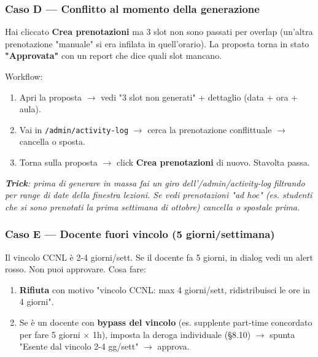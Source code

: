 \documentclass[11pt,a4paper]{article}
\renewenvironment{quote}
  {\begin{list}{}{%
      \setlength{\leftmargin}{8pt}%
      \setlength{\rightmargin}{8pt}%
      \setlength{\topsep}{6pt}%
      \setlength{\parsep}{0pt}}%
      \item\relax\color{black!75}\itshape}
  {\end{list}}
\begin{document}
\subsubsection{Caso D --- Conflitto al momento della generazione}


Hai cliccato \textbf{Crea prenotazioni} ma 3 slot non sono passati per overlap (un'altra prenotazione "manuale" si era infilata in quell'orario). La proposta torna in stato \textbf{"Approvata"} con un report che dice quali slot mancano.

Workflow:

\begin{enumerate}
  \item Apri la proposta $\rightarrow$ vedi "3 slot non generati" + dettaglio (data + ora + aula).
  \item Vai in \texttt{/admin/activity-log} $\rightarrow$ cerca la prenotazione conflittuale $\rightarrow$ cancella o sposta.
  \item Torna sulla proposta $\rightarrow$ click \textbf{Crea prenotazioni} di nuovo. Stavolta passa.
\end{enumerate}

\begin{quote}
\textbf{Trick}: prima di generare in massa fai un giro dell'/admin/activity-log filtrando per range di date della finestra lezioni. Se vedi prenotazioni "ad hoc" (es. studenti che si sono prenotati la prima settimana di ottobre) cancella o spostale prima.
\end{quote}

\subsubsection{Caso E --- Docente fuori vincolo (5 giorni/settimana)}


Il vincolo CCNL è 2-4 giorni/sett. Se il docente fa 5 giorni, in dialog vedi un alert rosso. Non puoi approvare. Cosa fare:

\begin{enumerate}
  \item \textbf{Rifiuta} con motivo "vincolo CCNL: max 4 giorni/sett, ridistribuisci le ore in 4 giorni".
  \item Se è un docente con \textbf{bypass del vincolo} (es. supplente part-time concordato per fare 5 giorni × 1h), imposta la deroga individuale (§8.10) $\rightarrow$ spunta "Esente dal vincolo 2-4 gg/sett" $\rightarrow$ approva.
\end{enumerate}
\end{document}
